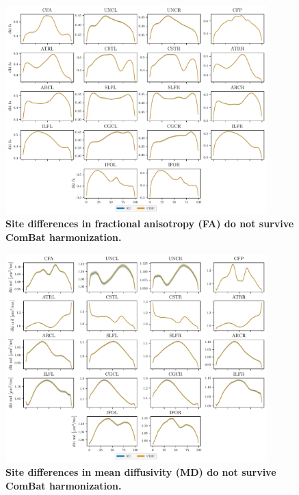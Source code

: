 \documentclass[10pt,letterpaper]{article}
\begin{document}
\begin{figure}
    \includegraphics[width=0.9\textwidth]{hbn_harmonized_profiles_fa.pdf}
    \caption{%
        {%
            \bf Site differences in fractional anisotropy (FA)
            do not survive ComBat harmonization.
        }
        \label{fig:hbn-harmonized-bp:fa}
    }
\end{figure}

\begin{figure}
    \includegraphics[width=0.9\textwidth]{hbn_harmonized_profiles_md.pdf}
    \caption{%
        {%
            \bf Site differences in mean diffusivity (MD)
            do not survive ComBat harmonization.
        }
        \label{fig:hbn-harmonized-bp:md}
    }
\end{figure}

\pagebreak


\end{document}
